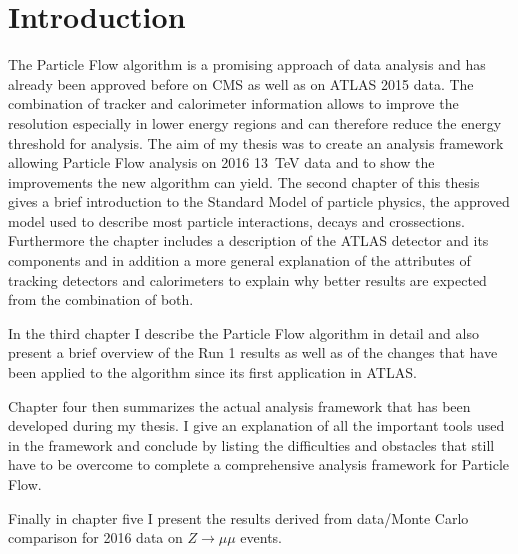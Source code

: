 \chapter{Introduction}
\label{sec:intro}




The Particle Flow algorithm is a promising approach of data analysis and has already been approved before on CMS as well as on ATLAS 2015 data. The combination of tracker  and calorimeter information allows to improve the resolution especially in lower energy regions and can therefore reduce the energy threshold for analysis. The aim of my thesis was to create an analysis framework allowing Particle Flow analysis on 2016 \SI{13}{\TeV} data and  to show the improvements the new algorithm can yield.
The second chapter of this thesis gives a brief introduction to the Standard Model of particle physics, the approved model used to describe most particle interactions, decays and crossections. Furthermore the chapter includes a description of the ATLAS detector and its components and in addition a more general explanation of the attributes of tracking detectors and calorimeters to explain why better results are expected from the combination of both.

In the third chapter I describe the Particle Flow algorithm in detail and also present a brief overview of the Run 1 results as well as of the changes that have been applied to the algorithm since its first application in ATLAS.

Chapter four then summarizes the actual analysis framework that has been developed during my thesis. I give an explanation of all the important tools used in the framework and conclude by listing the  difficulties and obstacles that still have to be overcome to complete a comprehensive analysis framework for Particle Flow.

Finally in chapter five I present the results derived from data/Monte Carlo comparison for 2016 data on $Z\rightarrow \mu \mu$ events.


